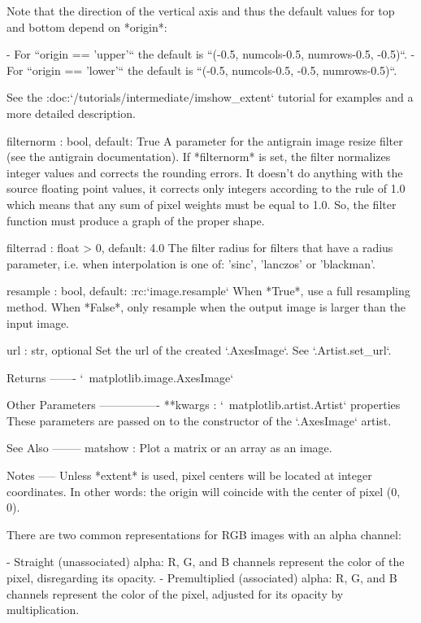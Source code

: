 \begin{DoxyVerb}
\begin{DoxyVerb}
    Note that the direction of the vertical axis and thus the default
    values for top and bottom depend on *origin*:

    - For ``origin == 'upper'`` the default is
      ``(-0.5, numcols-0.5, numrows-0.5, -0.5)``.
    - For ``origin == 'lower'`` the default is
      ``(-0.5, numcols-0.5, -0.5, numrows-0.5)``.

    See the :doc:`/tutorials/intermediate/imshow_extent` tutorial for
    examples and a more detailed description.

filternorm : bool, default: True
    A parameter for the antigrain image resize filter (see the
    antigrain documentation).  If *filternorm* is set, the filter
    normalizes integer values and corrects the rounding errors. It
    doesn't do anything with the source floating point values, it
    corrects only integers according to the rule of 1.0 which means
    that any sum of pixel weights must be equal to 1.0.  So, the
    filter function must produce a graph of the proper shape.

filterrad : float > 0, default: 4.0
    The filter radius for filters that have a radius parameter, i.e.
    when interpolation is one of: 'sinc', 'lanczos' or 'blackman'.

resample : bool, default: :rc:`image.resample`
    When *True*, use a full resampling method.  When *False*, only
    resample when the output image is larger than the input image.

url : str, optional
    Set the url of the created `.AxesImage`. See `.Artist.set_url`.

Returns
-------
`~matplotlib.image.AxesImage`

Other Parameters
----------------
**kwargs : `~matplotlib.artist.Artist` properties
    These parameters are passed on to the constructor of the
    `.AxesImage` artist.

See Also
--------
matshow : Plot a matrix or an array as an image.

Notes
-----
Unless *extent* is used, pixel centers will be located at integer
coordinates. In other words: the origin will coincide with the center
of pixel (0, 0).

There are two common representations for RGB images with an alpha
channel:

-   Straight (unassociated) alpha: R, G, and B channels represent the
    color of the pixel, disregarding its opacity.
-   Premultiplied (associated) alpha: R, G, and B channels represent
    the color of the pixel, adjusted for its opacity by multiplication.


\end{DoxyVerb}
\end{DoxyVerb}
